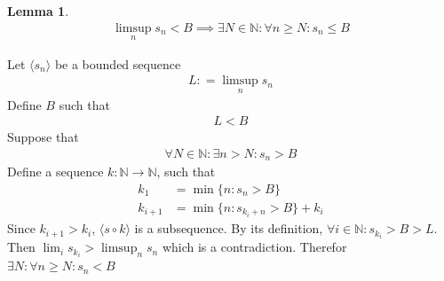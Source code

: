 \documentclass{amsart}
\numberwithin{equation}{section}
\let\oldendproof\endproof
\renewenvironment{proof}[1][\proofname]{%
  \setcounter{case}{0}
  \setcounter{step}{0}
  \oldproof[#1]%
}{\oldendproof}
\theoremstyle{plain}
\newtheorem{lemma}[theorem]{Lemma}
\theoremstyle{definition}
\theoremstyle{remark}
\begin{document}
\begin{lemma}
  \begin{align}
    \limsup_n s_n < B \implies \exists N\in\mathbb{N}: \forall n\geq N: s_n \leq B
  \end{align}
\end{lemma}
\begin{proof}
  Let $\langle s_n\rangle$ be a bounded sequence
  \begin{align}
    L : = \limsup_n s_n
  \end{align}
  Define $B$ such that
  \begin{align}
    L < B
  \end{align}
  Suppose that
  \begin{align}
    \forall N\in \mathbb{N}: \exists n > N: s_n > B
  \end{align}
  Define a sequence $k: \mathbb{N} \to \mathbb{N}$, such that
  \begin{align}
    k_1 &= \min \{ n: s_n > B \}\\
    k_{i+1} &= \min \{ n : s_{k_i+n} > B \} + k_i
  \end{align}
  Since $k_{i+1}> k_i$, $\langle s\circ k \rangle$ is a subsequence. By its definition, $\forall i\in \mathbb{N}: s_{k_i} > B > L$.
  Then $\lim_i s_{k_i} > \limsup_n s_n$ which is a contradiction.
  Therefor $\exists N: \forall n \geq N: s_n < B$
\end{proof}
\end{document}
